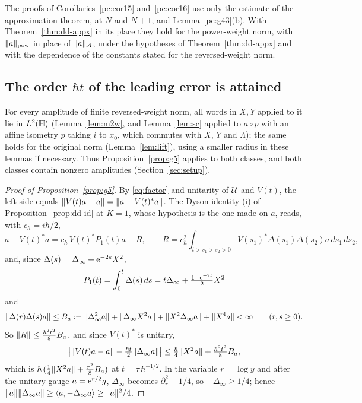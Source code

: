 \begin{remark}\label{rem:pw-cor}\label{cor:dd15-appx}\label{cor:dd16-appx}
The proofs of Corollaries~\ref{pc:cor15} and~\ref{pc:cor16} use only the estimate of the approximation theorem, at $N$ and
$N+1$, and Lemma~\ref{pc:g43}(b). With Theorem~\ref{thm:dd-appx} in its place they hold for the power-weight norm, with $\lVert a\rVert_{\mathrm{pow}}$ in
place of $\lVert a\rVert_{\mathcal A}$, under the hypotheses of Theorem~\ref{thm:dd-appx} and with the dependence of the constants stated
for the reversed-weight norm.
\end{remark}


\subsection{The order \texorpdfstring{$\hbar t$}{ht} of the leading error is attained}\label{subsec:g5proof}
For every amplitude of finite reversed-weight norm, all words in $X,Y$ applied to it lie in $L^2(\mathbb{H})$
(Lemma~\ref{lem:m2w}, and Lemma~\ref{lem:sc} applied to $a\circ p$ with an affine isometry $p$ taking $i$ to $x_0$, which
commutes with $X$, $Y$ and $\Lambda$); the same holds for the original norm
(Lemma~\ref{lem:lift}), using a smaller radius in these lemmas if necessary.
Thus Proposition~\ref{prop:g5} applies to both classes, and both classes contain nonzero amplitudes
(Section~\ref{sec:setup}).


\begin{proof}[Proof of Proposition~\ref{prop:g5}]
By \eqref{eq:factor} and unitarity of $\mathcal{U}$ and $V(t)$, the left side equals $\lVert V(t)a-a\rVert=\lVert a-V(t)^*a\rVert$. The Dyson
identity (i) of Proposition~\ref{prop:dd-id} at $K=1$, whose hypothesis is the one made on $a$, reads, with $c_\hbar=i\hbar/2$,
\[a-V(t)^*a=c_\hbar\,V(t)^*P_1(t)a+R,\qquad R=c_\hbar^2\int_{t>s_1>s_2>0}V(s_1)^*\Delta(s_1)\Delta(s_2)a\,ds_1\,ds_2,\]
and, since $\Delta(s)=\Delta_\infty+\mathrm{e}^{-2s}X^2$,
\[P_1(t)=\int_0^t\Delta(s)\,ds=t\Delta_\infty+\tfrac{1-\mathrm{e}^{-2t}}2X^2\]
and
\[\lVert \Delta(r)\Delta(s)a\rVert\le B_a:=\lVert \Delta_\infty^2a\rVert+\lVert \Delta_\infty X^2a\rVert+\lVert X^2\Delta_\infty a\rVert+\lVert X^4a\rVert<\infty\qquad(r,s\ge0).\]
So $\lVert R\rVert\le\tfrac{\hbar^2t^2}{8}B_a$, and since $V(t)^*$ is unitary,
\[\bigl|\lVert V(t)a-a\rVert-\tfrac{\hbar t}2\lVert \Delta_\infty a\rVert\bigr|\le\tfrac\hbar4\lVert X^2a\rVert+\tfrac{\hbar^2t^2}{8}B_a ,\]
which is $\hbar\,(\tfrac14\lVert X^2a\rVert+\tfrac{\tau^2}8B_a)$ at $t=\tau\,\hbar^{-1/2}$. In the variable $r=\log y$ and after the unitary
gauge $a=\mathrm{e}^{r/2}g$, $\Delta_\infty$ becomes $\partial_r^2-1/4$, so $-\Delta_\infty\ge1/4$; hence $\lVert a\rVert\lVert \Delta_\infty a\rVert\ge\langle a,-\Delta_\infty a\rangle\ge\lVert a\rVert^2/4$.
\end{proof}

